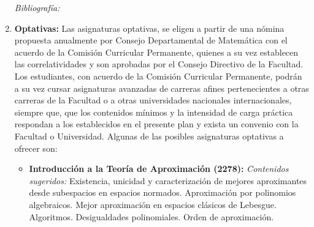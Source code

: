 \documentclass[a4paper, 12pt]{article}
\begin{document}
\begin{enumerate}



\emph{Bibliografía:} \cite{buell2021mathematics,karaali2021mathematics,karaali2019mathematics,doi:10.1080/10511970.2018.1530707,doi:10.1080/10511970.2018.1512538,doi:10.1080/10511970.2018.1456498,doi:10.1080/10511970.2018.1530706,doi:10.1080/10511970.2018.1456497,doi:10.1080/10511970.2018.1472683,FredRoberts1395,JuanCarlosCortes1396,DonaldG.Saari1397,LeeRudolph1398,UrszulaStrawinska-Zanko1399,HuijiongWang1400,AhmadK.Naimzada1401,ClaudioCioffi-Revilla1402}

 



\item\textbf{Optativas:} 
Las asignaturas optativas, se eligen a partir de una nómina propuesta anualmente por Consejo Departamental de Matemática con el acuerdo de la Comisión Curricular Permanente, quienes a su vez establecen las correlatividades y son aprobadas por el Consejo Directivo de la Facultad. Los estudiantes, con acuerdo de la Comisión Curricular
Permanente, podrán a su vez cursar asignaturas avanzadas de carreras afines pertenecientes a otras carreras de la Facultad o a otras universidades nacionales internacionales, siempre que, que los contenidos mínimos y la intensidad de carga
práctica respondan a los establecidos en el presente plan y exista un convenio con la Facultad o Universidad.
Algunas de las posibles asignaturas optativas a ofrecer son:




\begin{itemize}


\item\textbf{Introducción a la Teoría de Aproximación (2278):}
\emph{Contenidos sugeridos:}
Existencia, unicidad y caracterización de mejores aproximantes desde subespacios en espacios normados. Aproximación por polinomios algebraicos.  Mejor aproximación en espacios clásicos de Lebesgue. Algoritmos. Desigualdades polinomiales. Orden de aproximación. 


\end{itemize}
\end{enumerate}
\end{document}

